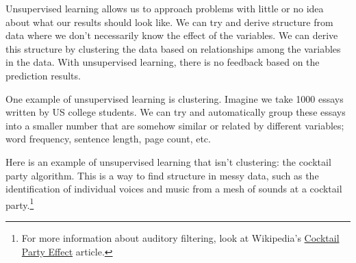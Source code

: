 Unsupervised learning allows us to approach problems with little or no idea about what our results should look like. We can try and derive structure from data where we don't necessarily know the effect of the variables. We can derive this structure by clustering the data based on relationships among the variables in the data. With unsupervised learning, there is no feedback based on the prediction results.

One example of unsupervised learning is clustering. Imagine we take 1000 essays written by US college students. We can try and automatically group these essays into a smaller number that are somehow similar or related by different variables; word frequency, sentence length, page count, etc. 

Here is an example of unsupervised learning that isn't clustering: the cocktail party algorithm. This is a way to find structure in messy data, such as the identification of individual voices and music from a mesh of sounds at a cocktail party.\footnote{For more information about auditory filtering, look at Wikipedia's \href{https://en.wikipedia.org/wiki/Cocktail_party_effect}{Cocktail Party Effect} article.} 